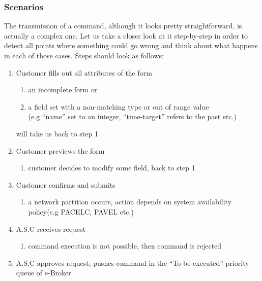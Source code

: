 \documentclass{article}
\begin{document}
\subsubsection{Scenarios}
The transmission of a command, although it looks pretty straightforward, is actually a complex one. Let us take a closer look at it step-by-step in order to detect all points where something could go wrong and think about what happens in each of those cases. Steps should look as follows:\\
\begin{enumerate}
\item Customer fills out all attributes of the form
\begin{enumerate}
\item an incomplete form or
\item a field set with a non-matching type or out of range value\\(e.g ``name'' set to an integer, ``time-target'' refers to the past etc.) 
\end{enumerate} 
will take us back to step 1 
\item Customer previews the form
\begin{enumerate}
\item customer decides to modify some field, back to step 1
\end{enumerate}
\item Customer confirms and submits
\begin{enumerate}
\item a network partition occurs, action depends on system availability policy(e.g PACELC, PAVEL etc.) 
\end{enumerate}
\item A.S.C receives request
\begin{enumerate}
\item command execution is not possible, then command is rejected
\end{enumerate}
\item A.S.C approves request, pushes command in the ``To be executed'' priority queue of e-Broker 
\end{enumerate} 
\end{document}
